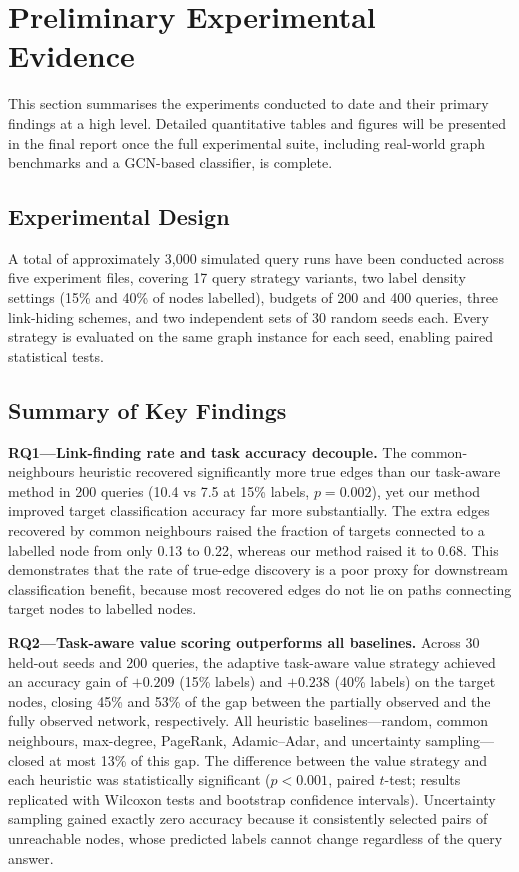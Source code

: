\documentclass[11pt,a4paper]{article}
\begin{document}
\section{Preliminary Experimental Evidence}
\label{sec:prelim}

This section summarises the experiments conducted to date and their primary findings at a high
level. Detailed quantitative tables and figures will be presented in the final report once
the full experimental suite, including real-world graph benchmarks and a GCN-based classifier,
is complete.

\subsection{Experimental Design}

A total of approximately 3,000 simulated query runs have been conducted across five experiment
files, covering 17 query strategy variants, two label density settings (15\% and 40\% of nodes
labelled), budgets of 200 and 400 queries, three link-hiding schemes, and two independent sets
of 30 random seeds each. Every strategy is evaluated on the same graph instance for each seed,
enabling paired statistical tests.

\subsection{Summary of Key Findings}

\textbf{RQ1---Link-finding rate and task accuracy decouple.}
The common-neighbours heuristic recovered significantly more true edges than our task-aware method
in 200 queries (10.4 vs 7.5 at 15\% labels, $p=0.002$), yet our method improved target
classification accuracy far more substantially. The extra edges recovered by common neighbours
raised the fraction of targets connected to a labelled node from only 0.13 to 0.22, whereas
our method raised it to 0.68. This demonstrates that the rate of true-edge discovery is a
poor proxy for downstream classification benefit, because most recovered edges do not lie on
paths connecting target nodes to labelled nodes.

\textbf{RQ2---Task-aware value scoring outperforms all baselines.}
Across 30 held-out seeds and 200 queries, the adaptive task-aware value strategy achieved an
accuracy gain of $+0.209$ (15\% labels) and $+0.238$ (40\% labels) on the target nodes, closing
45\% and 53\% of the gap between the partially observed and the fully observed network,
respectively. All heuristic baselines---random, common neighbours, max-degree, PageRank,
Adamic--Adar, and uncertainty sampling---closed at most 13\% of this gap. The difference between
the value strategy and each heuristic was statistically significant ($p<0.001$, paired $t$-test;
results replicated with Wilcoxon tests and bootstrap confidence intervals). Uncertainty sampling
gained exactly zero accuracy because it consistently selected pairs of unreachable nodes, whose
predicted labels cannot change regardless of the query answer.
\end{document}

